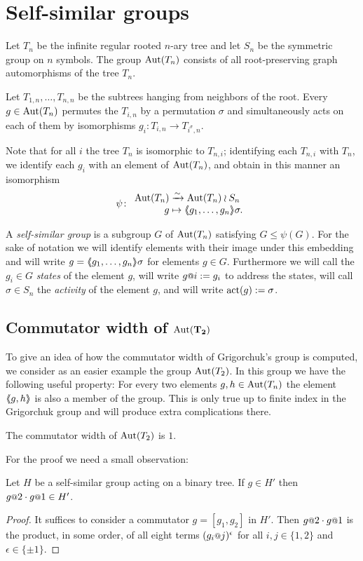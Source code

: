\documentclass[a4paper,11pt]{amsart}
\begin{document}
\section{Self-similar groups}\label{sec:SelfSimilarGroups}
Let $T_n$ be the infinite regular rooted $n$-ary tree and let $S_n$ be the symmetric group on $n$ symbols.
The group $\operatorname{{Aut}}(T_n)$ consists of all root-preserving graph automorphisms of the tree $T_n$. 

Let $T_{1,n},\dotsc,T_{n,n}$ be the subtrees hanging from neighbors of the root. 
Every $g\in\operatorname{{Aut}}(T_n)$ permutes the $T_{i,n}$ by a permutation $\sigma$ and simultaneously
acts on each of them by isomorphisms $g_i\colon T_{i,n}\to T_{i^\sigma,n}$.

Note that for all $i$ the tree $T_n$ is isomorphic to $T_{n,i}$; identifying each $T_{n,i}$ with $T_n$, 
we identify each $g_i$ with an element of $\operatorname{{Aut}}(T_n)$, and obtain in this manner an isomorphism
\[\psi\colon\begin{array}{r@{\;}l}
              \Aut(T_n) &\xrightarrow{\sim} \Aut(T_n)\wr S_n\\
              g &\mapsto \pair{g_1,\dotsc,g_n}\sigma.
            \end{array}
\]

A \emph{self-similar group} is a subgroup $G$ of $\operatorname{{Aut}}(T_n)$
satisfying $G\leq \psi(G)$.  For the sake of notation we will identify
elements with their image under this embedding and will write
$g=\langle\negthickspace\langle g_1,\dotsc,g_n\rangle\negthickspace\rangle\sigma$ for elements $g\in G$.  Furthermore we
will call the $g_i\in G$ \emph{states} of the element $g$, will write
$g\at{i}:=g_i$ to address the states, will call $\sigma \in S_n$ the
\emph{activity} of the element $g$, and will write $\operatorname{act}(g):= \sigma$.

\subsection{Commutator width of \texorpdfstring{$\mathbf{\textup{Aut}(T_2)}$}{Aut(T2)} }
To give an idea of how the commutator width of Grigorchuk's group is
computed, we consider as an easier example the group $\operatorname{{Aut}}(T_2)$. In
this group we have the following useful property: For every two
elements $g,h\in \operatorname{{Aut}}(T_n)$ the element $\langle\negthickspace\langle g,h\rangle\negthickspace\rangle$ is also a member
of the group.  This is only true up to finite index in the Grigorchuk
group and will produce extra complications there.

\begin{pro}\label{pro:comwidthAutT2}
 The commutator width of $\operatorname{{Aut}}(T_2)$ is $1$.
\end{pro}
For the proof we need a small observation:
\begin{lem}\label{lem:H'}
  Let $H$ be a self-similar group acting on a binary tree.
  If $g\in H'$ then $g\at{2}\cdot g\at{1}\in H'$. 
\end{lem}
\begin{proof}
  It suffices to consider a commutator $g=[g_1,g_2]$ in $H'$. Then
  $g\at 2\cdot g\at 1$ is the product, in some order, of all eight
  terms $(g_i\at j)^\epsilon$ for all $i,j\in\{1,2\}$ and
  $\epsilon\in\{\pm1\}$.
\end{proof}
\end{document}
